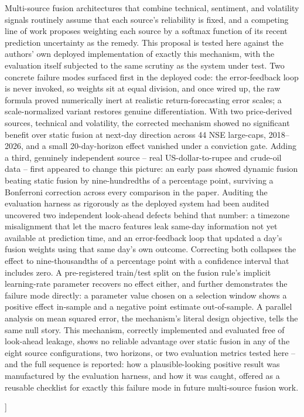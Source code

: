 \documentclass[10pt,a4paper,twocolumn]{article}
\begin{document}
{{\begin{minipage}{0.96\textwidth}
\begin{minipage}[t]{0.66\textwidth}
Multi-source fusion architectures that combine technical, sentiment, and volatility signals routinely assume that each source's reliability is fixed, and a competing line of work proposes weighting each source by a softmax function of its recent prediction uncertainty as the remedy. This proposal is tested here against the authors' own deployed implementation of exactly this mechanism, with the evaluation itself subjected to the same scrutiny as the system under test. Two concrete failure modes surfaced first in the deployed code: the error-feedback loop is never invoked, so weights sit at equal division, and once wired up, the raw formula proved numerically inert at realistic return-forecasting error scales; a scale-normalized variant restores genuine differentiation. With two price-derived sources, technical and volatility, the corrected mechanism showed no significant benefit over static fusion at next-day direction across 44 NSE large-caps, 2018--2026, and a small 20-day-horizon effect vanished under a conviction gate. Adding a third, genuinely independent source -- real US-dollar-to-rupee and crude-oil data -- first appeared to change this picture: an early pass showed dynamic fusion beating static fusion by nine-hundredths of a percentage point, surviving a Bonferroni correction across every comparison in the paper. Auditing the evaluation harness as rigorously as the deployed system had been audited uncovered two independent look-ahead defects behind that number: a timezone misalignment that let the macro features leak same-day information not yet available at prediction time, and an error-feedback loop that updated a day's fusion weights using that same day's own outcome. Correcting both collapses the effect to nine-thousandths of a percentage point with a confidence interval that includes zero. A pre-registered train/test split on the fusion rule's implicit learning-rate parameter recovers no effect either, and further demonstrates the failure mode directly: a parameter value chosen on a selection window shows a positive effect in-sample and a negative point estimate out-of-sample. A parallel analysis on mean squared error, the mechanism's literal design objective, tells the same null story. This mechanism, correctly implemented and evaluated free of look-ahead leakage, shows no reliable advantage over static fusion in any of the eight source configurations, two horizons, or two evaluation metrics tested here -- and the full sequence is reported: how a plausible-looking positive result was manufactured by the evaluation harness, and how it was caught, offered as a reusable checklist for exactly this failure mode in future multi-source fusion work.
\end{minipage}
\end{minipage}}
\vspace{14pt}
}]
\end{document}

